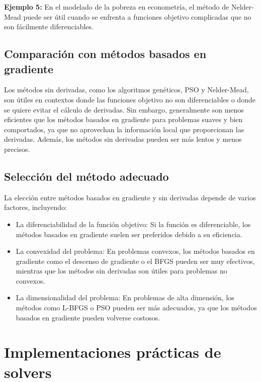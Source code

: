 \begin{flushleft}
	\textbf{Ejemplo 5:} En el modelado de la pobreza en econometría, el método de Nelder-Mead puede ser útil cuando se enfrenta a funciones objetivo complicadas que no son fácilmente diferenciables.
\end{flushleft}

\subsection{Comparación con métodos basados en gradiente}

\begin{flushleft}
	Los métodos sin derivadas, como los algoritmos genéticos, PSO y Nelder-Mead, son útiles en contextos donde las funciones objetivo no son diferenciables o donde se quiere evitar el cálculo de derivadas. Sin embargo, generalmente son menos eficientes que los métodos basados en gradiente para problemas suaves y bien comportados, ya que no aprovechan la información local que proporcionan las derivadas. Además, los métodos sin derivadas pueden ser más lentos y menos precisos.
\end{flushleft}

\subsection{Selección del método adecuado}

\begin{flushleft}
	La elección entre métodos basados en gradiente y sin derivadas depende de varios factores, incluyendo:
\end{flushleft}

\begin{itemize}
	\item La diferenciabilidad de la función objetivo: Si la función es diferenciable, los métodos basados en gradiente suelen ser preferidos debido a su eficiencia.
	\item La convexidad del problema: En problemas convexos, los métodos basados en gradiente como el descenso de gradiente o el BFGS pueden ser muy efectivos, mientras que los métodos sin derivadas son útiles para problemas no convexos.
	\item La dimensionalidad del problema: En problemas de alta dimensión, los métodos como L-BFGS o PSO pueden ser más adecuados, ya que los métodos basados en gradiente pueden volverse costosos.
\end{itemize}
\section{Implementaciones prácticas de solvers}


